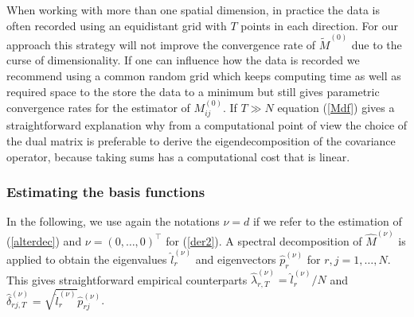 When working with more than one spatial dimension, in practice the data is often recorded using an equidistant grid with $T$ points in each direction. For our approach this strategy will not improve the convergence rate of $\tilde{M}^{(0)}$ due to the curse of dimensionality. If one can influence how the data is recorded we recommend using a common random grid which keeps computing time as well as required space to the store the data to a minimum but still gives parametric convergence rates for the estimator of $M_{ij}^{(0)}$. 
If $T\gg N$ equation (\ref{Mdf}) gives a straightforward explanation why from  a computational point of view the choice of the dual matrix is preferable to derive the eigendecomposition of the covariance operator, because taking sums has a computational cost that is linear.

\subsubsection{Estimating the basis functions }
\label{estderiv}
In the following, we use again the notations $\nu=d$ if we refer to the estimation of (\ref{alterdec}) and $\nu=(0,\dots,0)^\top$ for (\ref{der2}). A spectral decomposition of $\hat{M}^{(\nu)}$ is applied to obtain the eigenvalues $\hat{l}_r^{(\nu)}$ and eigenvectors $\hat{p}_r^{(\nu)}$ for $r,j=1,\dots,N$. This gives straightforward empirical counterparts  %
 $\hat{\lambda}^{(\nu)}_{r,T}=\hat{l}^{(\nu)}_r/N$ and $\hat{\delta}^{(\nu)}_{rj,T}=\sqrt{ \hat{l}^{(\nu)}_{r}} \hat{p}^{(\nu)}_{rj}$. %

